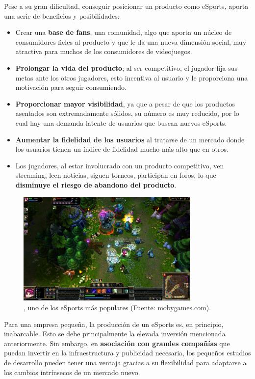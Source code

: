 Pese a su gran dificultad, conseguir posicionar un producto como eSports, aporta una serie de beneficios y posibilidades: 
\begin{itemize}
\item Crear una \textbf{base de fans}, una comunidad, algo que aporta un núcleo de consumidores fieles al producto y que le da una nueva dimensión social, muy atractiva para muchos de los consumidores de videojuegos.
\item \textbf{Prolongar la vida del producto}; al ser competitivo, el jugador fija sus metas ante los otros jugadores, esto incentiva al usuario y le proporciona una motivación para seguir consumiendo.
\item \textbf{Proporcionar mayor visibilidad}, ya que a pesar de que los productos asentados son extremadamente sólidos, su número es muy reducido, por lo cual hay una demanda latente de usuarios que buscan nuevos eSports.
\item \textbf{Aumentar la fidelidad de los usuarios} al tratarse de un mercado donde los usuarios tienen un índice de fidelidad mucho más alto que en otros.
\item Los jugadores, al estar involucrado con un producto competitivo, ven streaming, leen noticias, siguen torneos, participan en foros, lo que \textbf{disminuye el riesgo de abandono del producto}.
\end{itemize}
\begin{figure}[!t]
    \centering
    \includegraphics[width=0.8\textwidth]{images/estadodelarte/mercado/foto-lol}
    \caption{, uno de los eSports más populares (Fuente: mobygames.com).}
    \label{foto-lol}
\end{figure}

Para una empresa pequeña, la producción de un eSports es, en principio, inabarcable. Esto se debe principalmente la elevada inversión mencionada anteriormente. Sin embargo, en \textbf{asociación con grandes compañías} que puedan invertir en la infraestructura y publicidad necesaria, los pequeños estudios de desarrollo pueden tener una ventaja gracias a su flexibilidad para adaptarse a los cambios intrínsecos de un mercado nuevo. 

